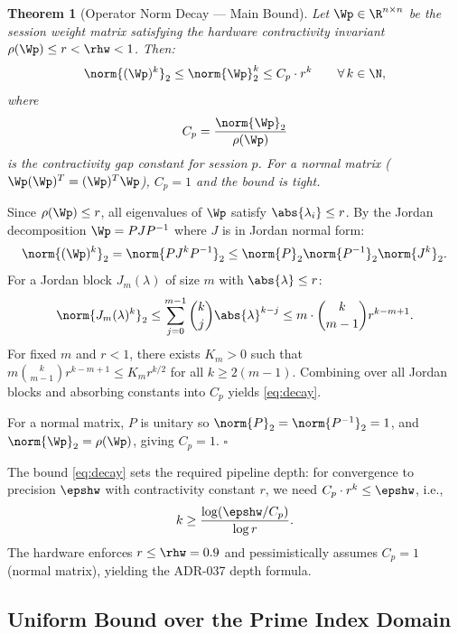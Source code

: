 \documentclass[12pt,letterpaper]{article}
\theoremstyle{plain}
\newtheorem{theorem}{Theorem}[section]
\theoremstyle{definition}
\theoremstyle{remark}
\begin{document}
\begin{theorem}[Operator Norm Decay --- Main Bound]
\label{thm:decay}
Let \(\Wp \in \R^{n \times n}\) be the session weight matrix satisfying the
hardware contractivity invariant \(\rho(\Wp) \leq r < \rhw < 1\). Then:
\begin{equation}
  \norm{(\Wp)^k}_2 \leq \norm{\Wp}_2^k \leq C_p \cdot r^k
  \qquad \forall\, k \in \N,
  \label{eq:decay}
\end{equation}
where
\begin{equation}
  C_p = \frac{\norm{\Wp}_2}{\rho(\Wp)}
  \label{eq:Cp}
\end{equation}
is the \emph{contractivity gap constant} for session \(p\). For a normal matrix
(\(\Wp (\Wp)^T = (\Wp)^T \Wp\)), \(C_p = 1\) and the bound is tight.
\end{theorem}

\begin{proofbox}
Since \(\rho(\Wp) \leq r\), all eigenvalues of \(\Wp\) satisfy
\(\abs{\lambda_i} \leq r\). By the Jordan decomposition
\(\Wp = P J P^{-1}\) where \(J\) is in Jordan normal form:
\[
  \norm{(\Wp)^k}_2 = \norm{P J^k P^{-1}}_2 \leq \norm{P}_2 \norm{P^{-1}}_2 \norm{J^k}_2.
\]
For a Jordan block \(J_m(\lambda)\) of size \(m\) with \(\abs{\lambda} \leq r\):
\[
  \norm{J_m(\lambda)^k}_2
  \leq \sum_{j=0}^{m-1} \binom{k}{j} \abs{\lambda}^{k-j}
  \leq m \cdot \binom{k}{m-1} r^{k-m+1}.
\]
For fixed \(m\) and \(r < 1\), there exists \(K_m > 0\) such that
\(m \binom{k}{m-1} r^{k-m+1} \leq K_m r^{k/2}\) for all \(k \geq 2(m-1)\).
Combining over all Jordan blocks and absorbing constants into \(C_p\)
yields \cref{eq:decay}.

For a normal matrix, \(P\) is unitary so \(\norm{P}_2 = \norm{P^{-1}}_2 = 1\),
and \(\norm{\Wp}_2 = \rho(\Wp)\), giving \(C_p = 1\). \hfill\(\square\)
\end{proofbox}

\begin{hwbox}
The bound \cref{eq:decay} sets the required pipeline depth: for convergence
to precision \(\epshw\) with contractivity constant \(r\), we need
\(C_p \cdot r^k \leq \epshw\), i.e.,
\[
  k \geq \frac{\log(\epshw / C_p)}{\log r}.
\]
The hardware enforces \(r \leq \rhw = 0.9\) and pessimistically assumes
\(C_p = 1\) (normal matrix), yielding the ADR-037 depth formula.
\end{hwbox}

\subsection{Uniform Bound over the Prime Index Domain}
\end{document}
